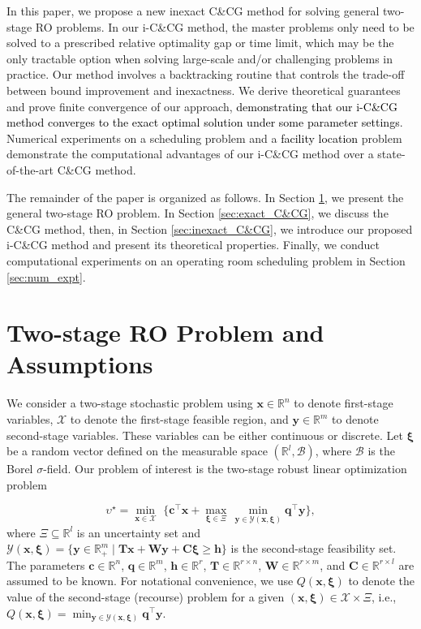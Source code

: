 \documentclass[preprint,review,11pt]{elsarticle}
\theoremstyle{definition}
\theoremstyle{remark}
\newcommand{\tp}{\top}
\newcommand{\R}{\mathbb{R}}
\newcommand{\calB}{\mathcal{B}}
\newcommand{\calX}{\mathcal{X}}
\newcommand{\calY}{\mathcal{Y}}
\newcommand{\xb}{\pmb{x}}
\newcommand{\yb}{\pmb{y}}
\newcommand{\cb}{\pmb{c}}
\newcommand{\hb}{\pmb{h}}
\newcommand{\qb}{\pmb{q}}
\newcommand{\xib}{\pmb{\xi}}
\newcommand{\Cb}{\pmb{C}}
\newcommand{\Tb}{\pmb{T}}
\newcommand{\Wb}{\pmb{W}}
\newcommand{\blue}{\textcolor{black}}
\begin{document}
In this paper, we propose a new inexact C\&CG method for solving general two-stage RO problems. In our i-C\&CG method, the master problems only need to be solved to a prescribed relative optimality gap or time limit, which may be the only tractable option when solving large-scale and/or challenging problems in practice.  Our method involves a backtracking routine that controls the trade-off between bound improvement and inexactness. We derive theoretical guarantees and prove finite convergence of our approach, \blue{demonstrating that our i-C\&CG method converges to the exact optimal solution under some parameter settings}. Numerical experiments on a scheduling problem and a \blue{facility location} problem demonstrate the computational advantages of our i-C\&CG method over a state-of-the-art C\&CG method.

The remainder of the paper is organized as follows. In Section \ref{sec:problem}, we present the general two-stage RO problem.  In Section \ref{sec:exact_C&CG}, we discuss the C\&CG method, then, in Section \ref{sec:inexact_C&CG}, we introduce our proposed i-C\&CG method and present its theoretical properties. Finally, we conduct computational experiments on an operating room scheduling problem in Section \ref{sec:num_expt}.

\section{Two-stage RO Problem and Assumptions} \label{sec:problem}

We consider a two-stage stochastic problem using $\xb\in\R^n$ to denote first-stage variables, $\calX$ to denote the first-stage feasible region, and $\yb\in\R^m$ to denote second-stage variables. These variables can be either continuous or discrete.  Let $\xib$ be a random vector defined on the measurable space $(\R^l, \calB)$, where $\calB$ is the Borel $\sigma$-field. Our problem of interest is the two-stage robust linear optimization problem
\allowdisplaybreaks

%
\begin{equation} \label{prob:2S_robust}
    \upsilon^\star = \min_{\xb\in\calX}\,\,\bigg\{ \cb^\tp \xb + \max_{\xib\in\Xi} \, \min_{\yb\in\calY(\xb,\xib)} \qb^\tp \yb \bigg\},
\end{equation}
%
where $\Xi\subseteq\R^l$ is an uncertainty set and $\calY(\xb,\xib)=\{\yb\in\R^m_+ \mid \Tb\xb +  \Wb\yb + \Cb\xib \geq \hb\}$ is the second-stage feasibility set. The parameters $\cb\in\R^n$, $\qb\in\R^m$, $\hb\in\R^r$, $\Tb\in\R^{r\times n}$, $\Wb\in\R^{r\times m}$, and $\Cb\in\R^{r\times l}$ are assumed to be known. For notational convenience, we use $Q(\xb,\xib)$ to denote the value of the second-stage (recourse) problem for a given $(\xb,\xib)\in\calX\times\Xi$, i.e., $Q(\xb,\xib)=\min_{\yb\in\calY(\xb,\xib)}\qb^\tp\yb$.
\end{document}
